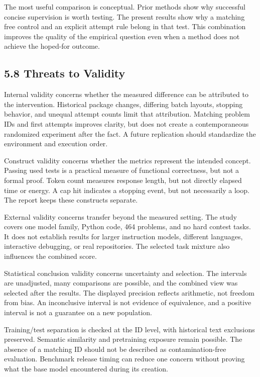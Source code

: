 \documentclass[11pt,letterpaper]{article}
\begin{document}
The most useful comparison is conceptual. Prior methods show why successful concise supervision is worth testing. The present results show why a matching free control and an explicit attempt rule belong in that test. This combination improves the quality of the empirical question even when a method does not achieve the hoped-for outcome.\par

\subsection*{5.8 Threats to Validity}

Internal validity concerns whether the measured difference can be attributed to the intervention. Historical package changes, differing batch layouts, stopping behavior, and unequal attempt counts limit that attribution. Matching problem IDs and first attempts improves clarity, but does not create a contemporaneous randomized experiment after the fact. A future replication should standardize the environment and execution order.\par

Construct validity concerns whether the metrics represent the intended concept. Passing used tests is a practical measure of functional correctness, but not a formal proof. Token count measures response length, but not directly elapsed time or energy. A cap hit indicates a stopping event, but not necessarily a loop. The report keeps these constructs separate.\par

External validity concerns transfer beyond the measured setting. The study covers one model family, Python code, 464 problems, and no hard contest tasks. It does not establish results for larger instruction models, different languages, interactive debugging, or real repositories. The selected task mixture also influences the combined score.\par

Statistical conclusion validity concerns uncertainty and selection. The intervals are unadjusted, many comparisons are possible, and the combined view was selected after the results. The displayed precision reflects arithmetic, not freedom from bias. An inconclusive interval is not evidence of equivalence, and a positive interval is not a guarantee on a new population.\par

Training/test separation is checked at the ID level, with historical text exclusions preserved. Semantic similarity and pretraining exposure remain possible. The absence of a matching ID should not be described as contamination-free evaluation. Benchmark release timing can reduce one concern without proving what the base model encountered during its creation.\par
\end{document}
